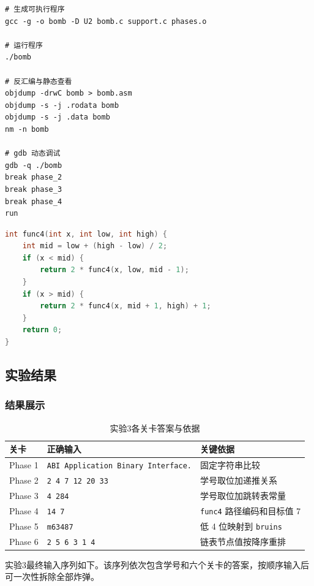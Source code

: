 \documentclass[supercite]{Experimental_Report}
\theoremstyle{definition}
\begin{document}
\begin{lstlisting}[language=Shell, caption={实验3中使用的典型命令}, label={lst:lab3-shell}]
# 生成可执行程序
gcc -g -o bomb -D U2 bomb.c support.c phases.o

# 运行程序
./bomb

# 反汇编与静态查看
objdump -drwC bomb > bomb.asm
objdump -s -j .rodata bomb
objdump -s -j .data bomb
nm -n bomb

# gdb 动态调试
gdb -q ./bomb
break phase_2
break phase_3
break phase_4
run
\end{lstlisting}

\begin{lstlisting}[language=C, caption={第四关递归函数逻辑抽象}, label={lst:lab3-func4}]
int func4(int x, int low, int high) {
    int mid = low + (high - low) / 2;
    if (x < mid) {
        return 2 * func4(x, low, mid - 1);
    }
    if (x > mid) {
        return 2 * func4(x, mid + 1, high) + 1;
    }
    return 0;
}
\end{lstlisting}

\subsection{实验结果}
\subsubsection{结果展示}
\begin{table}[H]
  \centering
  \caption{实验3各关卡答案与依据}
  \label{tbl:lab3-result}
  \begin{tabular}{p{}p{}p{}}
    \toprule
    关卡 & 正确输入 & 关键依据 \\
    \midrule
    Phase 1 & \texttt{ABI Application Binary Interface.} & 固定字符串比较 \\
    Phase 2 & \texttt{2 4 7 12 20 33} & 学号取位加递推关系 \\
    Phase 3 & \texttt{4 284} & 学号取位加跳转表常量 \\
    Phase 4 & \texttt{14 7} & \texttt{func4} 路径编码和目标值 7 \\
    Phase 5 & \texttt{m63487} & 低 4 位映射到 \texttt{bruins} \\
    Phase 6 & \texttt{2 5 6 3 1 4} & 链表节点值按降序重排 \\
    \bottomrule
  \end{tabular}
\end{table}

实验3最终输入序列如下。该序列依次包含学号和六个关卡的答案，按顺序输入后可一次性拆除全部炸弹。
\end{document}
